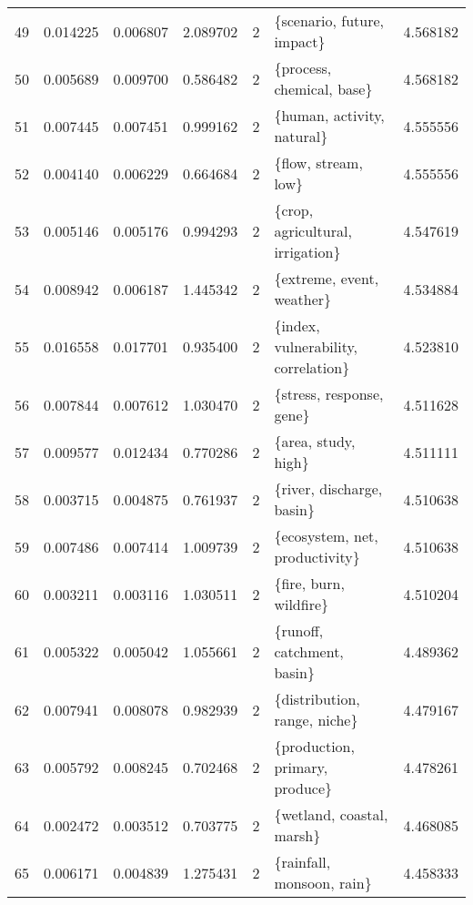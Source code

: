 \begin{tabular}{lrrrrlr}
49  &    0.014225 &  0.006807 &        2.089702 &           2 &              \{scenario, future, impact\} &  4.568182 \\
50  &    0.005689 &  0.009700 &        0.586482 &           2 &               \{process, chemical, base\} &  4.568182 \\
51  &    0.007445 &  0.007451 &        0.999162 &           2 &              \{human, activity, natural\} &  4.555556 \\
52  &    0.004140 &  0.006229 &        0.664684 &           2 &                     \{flow, stream, low\} &  4.555556 \\
53  &    0.005146 &  0.005176 &        0.994293 &           2 &        \{crop, agricultural, irrigation\} &  4.547619 \\
54  &    0.008942 &  0.006187 &        1.445342 &           2 &               \{extreme, event, weather\} &  4.534884 \\
55  &    0.016558 &  0.017701 &        0.935400 &           2 &     \{index, vulnerability, correlation\} &  4.523810 \\
56  &    0.007844 &  0.007612 &        1.030470 &           2 &                \{stress, response, gene\} &  4.511628 \\
57  &    0.009577 &  0.012434 &        0.770286 &           2 &                     \{area, study, high\} &  4.511111 \\
58  &    0.003715 &  0.004875 &        0.761937 &           2 &               \{river, discharge, basin\} &  4.510638 \\
59  &    0.007486 &  0.007414 &        1.009739 &           2 &          \{ecosystem, net, productivity\} &  4.510638 \\
60  &    0.003211 &  0.003116 &        1.030511 &           2 &                  \{fire, burn, wildfire\} &  4.510204 \\
61  &    0.005322 &  0.005042 &        1.055661 &           2 &              \{runoff, catchment, basin\} &  4.489362 \\
62  &    0.007941 &  0.008078 &        0.982939 &           2 &            \{distribution, range, niche\} &  4.479167 \\
63  &    0.005792 &  0.008245 &        0.702468 &           2 &          \{production, primary, produce\} &  4.478261 \\
64  &    0.002472 &  0.003512 &        0.703775 &           2 &               \{wetland, coastal, marsh\} &  4.468085 \\
65  &    0.006171 &  0.004839 &        1.275431 &           2 &               \{rainfall, monsoon, rain\} &  4.458333 \\

\end{tabular}
